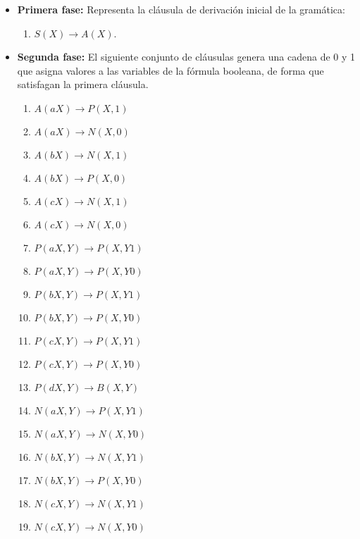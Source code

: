 \begin{itemize}
    \item \textbf{Primera fase:} Representa la cláusula de derivación inicial de la gramática:
          \begin{enumerate}
              \item $S(X)\to A(X)$.
          \end{enumerate}

    \item \textbf{Segunda fase:} El siguiente conjunto de cláusulas genera una cadena de 0 y 1 que asigna valores a las
          variables de la fórmula booleana, de forma que satisfagan la primera cláusula.
          \begin{multicols}{2}
              \begin{enumerate}[start=2]
                  \item $A(aX)\to P(X,1)$
                  \item $A(aX)\to N(X,0)$
                  \item $A(bX)\to N(X,1)$
                  \item $A(bX)\to P(X,0)$
                  \item $A(cX)\to N(X,1)$
                  \item $A(cX)\to N(X,0)$

                  \item $P(aX,Y)\to P(X,Y1)$
                  \item $P(aX,Y)\to P(X,Y0)$
                  \item $P(bX,Y)\to P(X,Y1)$
                  \item $P(bX,Y)\to P(X,Y0)$
                  \item $P(cX,Y)\to P(X,Y1)$
                  \item $P(cX,Y)\to P(X,Y0)$
                  \item $P(dX,Y)\to B(X,Y)$

                  \item $N(aX,Y)\to P(X,Y1)$
                  \item $N(aX,Y)\to N(X,Y0)$
                  \item $N(bX,Y)\to N(X,Y1)$
                  \item $N(bX,Y)\to P(X,Y0)$
                  \item $N(cX,Y)\to N(X,Y1)$
                  \item $N(cX,Y)\to N(X,Y0)$
              \end{enumerate}
          \end{multicols}


\end{itemize}

